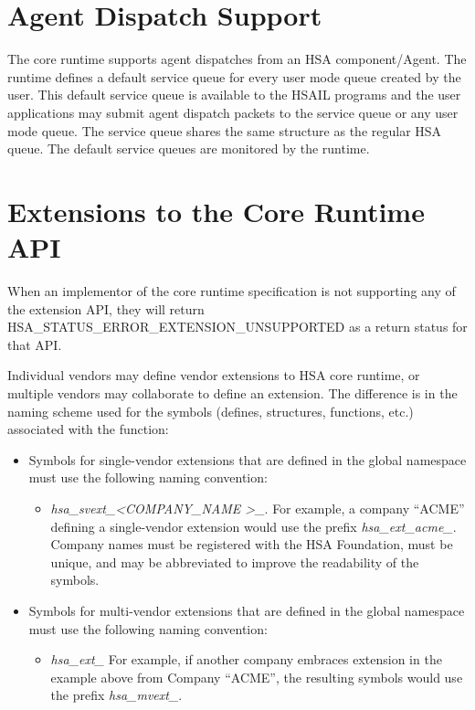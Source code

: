 \documentclass[draft]{book}
\newcommand{\reftyp}[1]{#1}
\newcommand{\refenu}[1]{\reftyp{#1}}
\begin{document}

% 

\hypertarget{agent}{}\section{Agent Dispatch Support}\label{agent}

The core runtime supports agent dispatches from an HSA component/Agent. The
runtime defines a default service queue for every user mode queue created by the
user. This default service queue is available to the HSAIL programs and the user
applications may submit agent dispatch packets to the service queue or any user
mode queue. The service queue shares the same structure as the regular HSA
queue. The default service queues are monitored by the
runtime. 


\hypertarget{extensions}{}\section{Extensions to the Core Runtime
  API}\label{extensions}

When an implementor of the core runtime specification is not supporting any of
the extension API, they will return
\refenu{HSA_STATUS_ERROR_EXTENSION_UNSUPPORTED} as a return status for that API.

Individual vendors may define vendor extensions to HSA core runtime, or multiple
vendors may collaborate to define an extension. The difference is in the naming
scheme used for the symbols (defines, structures, functions, etc.) associated
with the function:

\begin{itemize}
\item Symbols for single-vendor extensions that are defined in the global
  namespace must use the following naming convention:
  \begin{itemize}
  \item \emph{hsa_svext_\textless COMPANY_NAME \textgreater_}. For example,
    a company ``ACME'' defining a single-vendor extension would use the prefix
    \emph{hsa_ext_acme_}. Company names must be registered with the HSA
    Foundation, must be unique, and may be abbreviated to improve the
    readability of the symbols.
  \end{itemize}
\item Symbols for multi-vendor extensions that are defined in the global
  namespace must use the following naming convention:
  \begin{itemize}
  \item \emph{hsa_ext_} For example, if another company embraces extension in
    the example above from Company ``ACME'', the resulting symbols would use the
    prefix \emph{hsa_mvext_}.
  \end{itemize}
\end{itemize}
\end{document}
